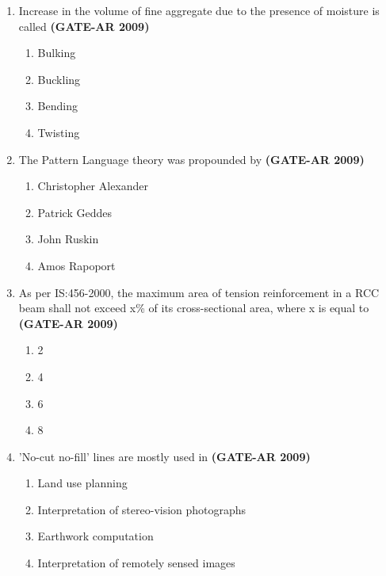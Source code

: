 \documentclass[a4paper,10pt]{article}
\begin{document}
\begin{enumerate}
    \item Increase in the volume of fine aggregate due to the presence of moisture is called \hfill \textbf{(GATE-AR 2009)}
    \begin{multicols}{4}
	\begin{enumerate}
        \item Bulking
        \item Buckling
        \item Bending
        \item Twisting
    \end{enumerate}
	\end{multicols}
    
    \item The Pattern Language theory was propounded by \hfill \textbf{(GATE-AR 2009)}
    \begin{multicols}{2}
	\begin{enumerate}
        \item Christopher Alexander
        \item Patrick Geddes
        \item John Ruskin
        \item Amos Rapoport
    \end{enumerate}
	\end{multicols}
    
    \item As per IS:456-2000, the maximum area of tension reinforcement in a RCC beam shall not exceed x\% of its cross-sectional area, where x is equal to \hfill \textbf{(GATE-AR 2009)}
    \begin{multicols}{4}
	\begin{enumerate}
        \item 2
        \item 4
        \item 6
        \item 8
    \end{enumerate}
	\end{multicols}
    
    \item 'No-cut no-fill' lines are mostly used in \hfill \textbf{(GATE-AR 2009)}
    \begin{multicols}{2}
	\begin{enumerate}
        \item Land use planning
        \item Interpretation of stereo-vision photographs
        \item Earthwork computation
        \item Interpretation of remotely sensed images
    \end{enumerate}
	\end{multicols}
    

\end{enumerate}
\end{document}
